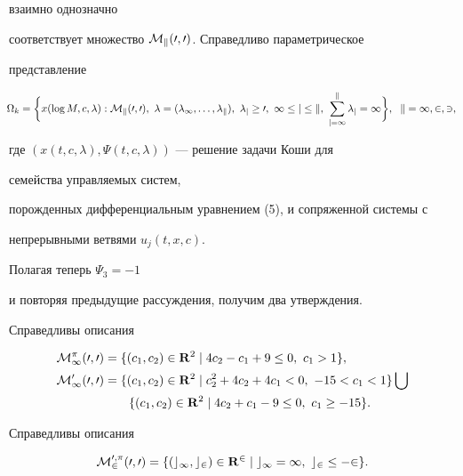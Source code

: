 взаимно однозначно


соответствует множество $\cal M_k(0,0)$. Справедливо параметрическое


представление


\begin{equation}


\negthickspace


\Omega_k=\biggl\{x(\log M,c,\lambda):\cal M_k(0,0), \ \lambda=


(\lambda_1,\dotsc,\lambda_k), \ \lambda_j\ge 0, \ 1\le j\le k,


\ \sum^k_{j=1}\lambda_j=1\biggr\}, \ \;k=1,2,3,


\end{equation}


где $(x(t,c,\lambda),\Psi(t,c,\lambda))$ --- решение задачи Коши для


семейства управляемых систем,


порожденных дифференциальным уравнением (5), и сопряженной системы с


непрерывными ветвями $u_j(t,x,c)$.





Полагая теперь $\Psi_3=-1$


и повторяя предыдущие рассуждения, получим два утверждения.





\begin{lem}


Справедливы описания


\begin{align*}


\cal M^\pi_1(0,0)&=\{(c_1,c_2)\in\bold R^2\mid


4c_2-c_1+9\le 0,\ c_1>1\}, \\


%


\cal M^0_1(0,0)&=\{(c_1,c_2)\in\bold R^2\mid


c^2_2+4c_2+4c_1<0, \ -15<c_1<1\}\bigcup\\


&\qquad\{(c_1,c_2)\in\bold R^2\mid 4c_2+c_1-9\le 0,\ c_1\ge -15\}.


\end{align*}


\end{lem}





\begin{lem}


Справедливы описания


$$


\cal M^{0,\pi}_2(0,0)=\{(c_1,c_2)\in\bold R^2\mid


c_1=1, \ c_2\le -2\}.


$$


\end{lem}





